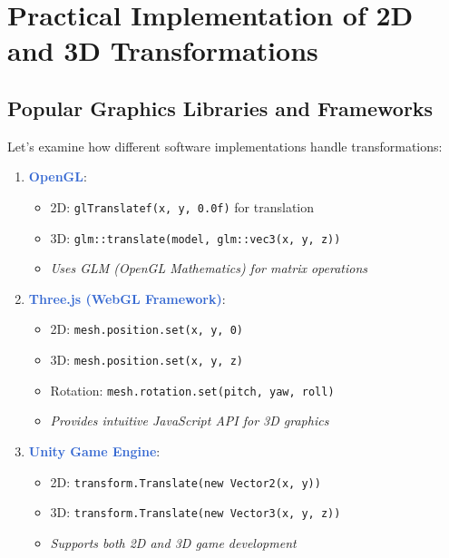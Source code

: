 \documentclass[12pt]{article}
\begin{document}
\section{Practical Implementation of 2D and 3D Transformations}\label{sec:transformations}

\subsection{Popular Graphics Libraries and Frameworks}
Let's examine how different software implementations handle transformations:

\begin{enumerate}
    \item \textcolor{highlight}{\textbf{OpenGL}}:
        \begin{itemize}
            \item 2D: \texttt{glTranslatef(x, y, 0.0f)} for translation
            \item 3D: \texttt{glm::translate(model, glm::vec3(x, y, z))}
            \item \textcolor{note}{\textit{Uses GLM (OpenGL Mathematics) for matrix operations}}
        \end{itemize}
    
    \item \textcolor{highlight}{\textbf{Three.js (WebGL Framework)}}:
        \begin{itemize}
            \item 2D: \texttt{mesh.position.set(x, y, 0)}
            \item 3D: \texttt{mesh.position.set(x, y, z)}
            \item Rotation: \texttt{mesh.rotation.set(pitch, yaw, roll)}
            \item \textcolor{note}{\textit{Provides intuitive JavaScript API for 3D graphics}}
        \end{itemize}
        
    \item \textcolor{highlight}{\textbf{Unity Game Engine}}:
        \begin{itemize}
            \item 2D: \texttt{transform.Translate(new Vector2(x, y))}
            \item 3D: \texttt{transform.Translate(new Vector3(x, y, z))}
            \item \textcolor{note}{\textit{Supports both 2D and 3D game development}}
        \end{itemize}
\end{enumerate}
\end{document}
